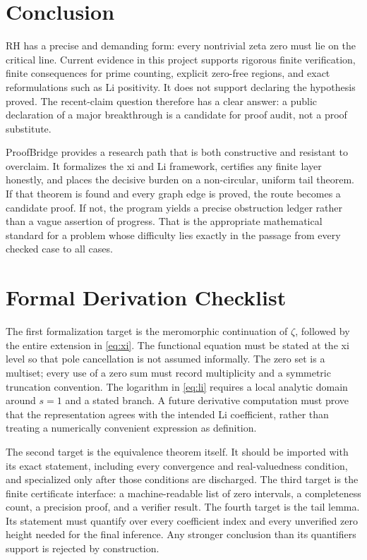 \documentclass[conference]{../../../../Conference-LaTeX-template_10-17-19/IEEEtran}
\begin{document}
\section{Conclusion}
RH has a precise and demanding form: every nontrivial zeta zero must lie on the critical line. Current evidence in this project supports rigorous finite verification, finite consequences for prime counting, explicit zero-free regions, and exact reformulations such as Li positivity. It does not support declaring the hypothesis proved. The recent-claim question therefore has a clear answer: a public declaration of a major breakthrough is a candidate for proof audit, not a proof substitute.

ProofBridge provides a research path that is both constructive and resistant to overclaim. It formalizes the xi and Li framework, certifies any finite layer honestly, and places the decisive burden on a non-circular, uniform tail theorem. If that theorem is found and every graph edge is proved, the route becomes a candidate proof. If not, the program yields a precise obstruction ledger rather than a vague assertion of progress. That is the appropriate mathematical standard for a problem whose difficulty lies exactly in the passage from every checked case to all cases.

\appendices
\section{Formal Derivation Checklist}
The first formalization target is the meromorphic continuation of $\zeta$, followed by the entire extension in \eqref{eq:xi}. The functional equation must be stated at the xi level so that pole cancellation is not assumed informally. The zero set is a multiset; every use of a zero sum must record multiplicity and a symmetric truncation convention. The logarithm in \eqref{eq:li} requires a local analytic domain around $s=1$ and a stated branch. A future derivative computation must prove that the representation agrees with the intended Li coefficient, rather than treating a numerically convenient expression as definition.

The second target is the equivalence theorem itself. It should be imported with its exact statement, including every convergence and real-valuedness condition, and specialized only after those conditions are discharged. The third target is the finite certificate interface: a machine-readable list of zero intervals, a completeness count, a precision proof, and a verifier result. The fourth target is the tail lemma. Its statement must quantify over every coefficient index and every unverified zero height needed for the final inference. Any stronger conclusion than its quantifiers support is rejected by construction.
\end{document}
